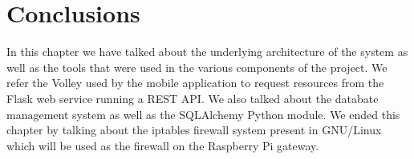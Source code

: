 \section{Conclusions}
\label{chap3:sec:concs}
In this chapter we have talked about the underlying architecture of the system
as well as the tools that were used in the various components of the project.
We refer the Volley used by the mobile application to request resources from the
Flask web service running a REST API. We also talked about the databate
management system as well as the SQLAlchemy Python module. We ended this chapter
by talking about the iptables firewall system present in GNU/Linux which will be
used as the firewall on the Raspberry Pi gateway.
